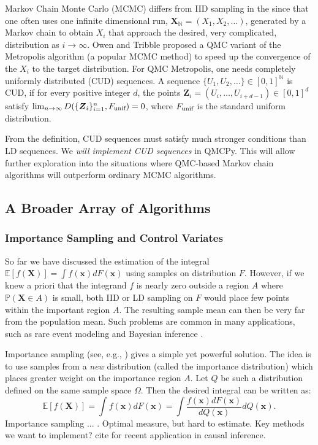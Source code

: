 \documentclass[11pt]{NSFamsart}
\newcommand{\unif}{\textup{unif}}
\newcommand{\naturals}{{\mathbb{N}}}
\newcommand{\bx}{{\boldsymbol{x}}}
\newcommand{\bX}{{\boldsymbol{X}}}
\newcommand{\bZ}{{\boldsymbol{Z}}}
\begin{document}
Markov Chain Monte Carlo (MCMC) differs from IID sampling in the since that one often uses one infinite dimensional run, $\bX_{\naturals} = (X_1, X_2, \dots)$, generated by a Markov chain to obtain $X_i$ that approach the desired, very complicated, distribution as $i \to \infty$.  Owen and Tribble \cite{OweTri05a} proposed a QMC variant of the Metropolis algorithm (a popular MCMC method) to speed up the convergence of the $X_i$ to the target distribution.  For QMC Metropolis, one needs completely uniformly distributed (CUD) sequences.  A sequence $\{U_1, U_2, \ldots \} \in [0, 1]^{\naturals}$  is CUD, if for every positive integer $d$, the points $\bZ_i = (U_{i}, \ldots, U_{i+d-1}) \in [0, 1]^d$ satisfy $\lim_{n \to \infty} D(\{ \bZ_i\}_{i=1}^n,F_{\unif}) = 0$, where $F_{\unif}$  is the standard uniform distribution.

From the definition, CUD  sequences must satisfy much stronger conditions than LD sequences.  We \emph{will implement CUD sequences} in QMCPy.  This will allow further exploration into the situations where QMC-based Markov chain algorithms will outperform ordinary MCMC algorithms.


\subsection{A Broader Array of Algorithms}

\subsubsection{Importance Sampling and Control Variates}
So far we have discussed the estimation of the integral $\mathbb{E}[f(\bX)] = \int f(\bx) dF(\bx)$ using samples on distribution $F$. However, if we knew a priori that the integrand $f$ is nearly zero outside a region $A$ where $\mathbb{P}(\bX \in A)$ is small, both IID or LD sampling on $F$ would place few points within the important region $A$. The resulting sample mean can then be very far from the population mean. Such problems are common in many applications, such as rare event modeling \cite{rubino2009rare} and Bayesian inference \cite{salmeron2000importance}.

Importance sampling (see, e.g., \cite{owen2000safe}) gives a simple yet powerful solution. The idea is to use samples from a \textit{new} distribution (called the importance distribution) which places greater weight on the importance region $A$. Let $Q$ be such a distribution defined on the same sample space $\Omega$. Then the desired integral can be written as:
\begin{equation}\label{eq:imp}
\mathbb{E}[f(\bX)] = \int f(\bx) dF(\bx) = \int \frac{f(\bx)dF(\bx)}{dQ(\bx)} dQ(\bx).
\end{equation}
Importance sampling ... . Optimal measure, but hard to estimate. Key methods we want to implement? cite \cite{huling2020energy} for recent application in causal inference.
\end{document}
